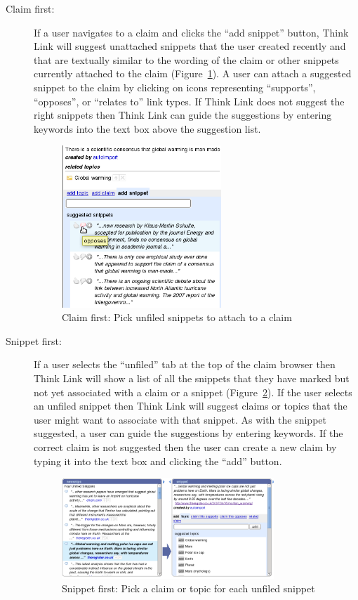 \documentclass{chi2009}
\begin{document}
\begin{description}
\item[Claim first:] If a user navigates to a claim and clicks the ``add snippet'' button, Think Link will suggest unattached snippets that the user created recently and that are textually similar to the wording of the claim or other snippets currently attached to the claim (Figure~\ref{snipclaim}). A user can attach a suggested snippet to the claim by clicking on icons representing ``supports'', ``opposes'', or ``relates to'' link types. If Think Link does not suggest the right snippets then Think Link can guide the suggestions by entering keywords into the text box above the suggestion list.

\begin{figure}[tb]
	\begin{center}
	\includegraphics[width=6cm]{../screenshots/v2_sugsnippet.png}
	\caption{Claim first: Pick unfiled snippets to attach to a claim}
	\label{snipclaim}
	\end{center}
\end{figure}

\item[Snippet first:] If a user selects the ``unfiled'' tab at the top of the claim browser then Think Link will show a list of all the snippets that they have marked but not yet associated with a claim or a snippet (Figure~\ref{sniptopic}). If the user selects an unfiled snippet then Think Link will suggest claims or topics that the user might want to associate with that snippet. As with the snippet suggested, a user can guide the suggestions by entering keywords. If the correct claim is not suggested then the user can create a new claim by typing it into the text box and clicking the ``add'' button.

\begin{figure}[tb]
	\begin{center}
	\includegraphics[width=8cm]{../screenshots/v2_sniptopic.png}
	\caption{Snippet first: Pick a claim or topic for each unfiled snippet}
	\label{sniptopic}
	\end{center}
\end{figure}


\end{description}
\end{document}
